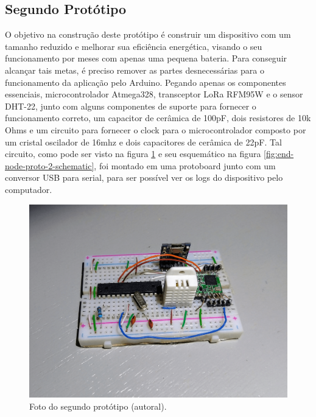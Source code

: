 \subsection{Segundo Protótipo}
\label{metod:end-node:2-proto}
O objetivo na construção deste protótipo é construir um dispositivo com um tamanho reduzido e melhorar sua eficiência energética, visando o seu funcionamento por meses com apenas uma pequena bateria. Para conseguir alcançar tais metas, é preciso remover as partes desnecessárias para o funcionamento da aplicação pelo Arduino. Pegando apenas os componentes essenciais, microcontrolador Atmega328, transceptor LoRa RFM95W e o sensor DHT-22, junto com alguns componentes de suporte para fornecer o funcionamento correto, um capacitor de cerâmica de 100pF, dois resistores de 10k Ohms  e um circuito para fornecer o clock para o microcontrolador composto por um cristal oscilador de 16mhz e dois capacitores de cerâmica de 22pF. Tal circuito, como pode ser visto na figura \ref{fig:end-node-proto-2} e seu esquemático na figura \ref{fig:end-node-proto-2-schematic}, foi montado em uma protoboard junto com um conversor USB para serial, para ser possível ver os logs do dispositivo pelo computador.

\begin{figure}[H]
  \centering
  \includegraphics[width=.80\textwidth]{assets/end-node-proto-2.png} 
  \caption{Foto do segundo protótipo (autoral).}
  \label{fig:end-node-proto-2} 
\end{figure}

